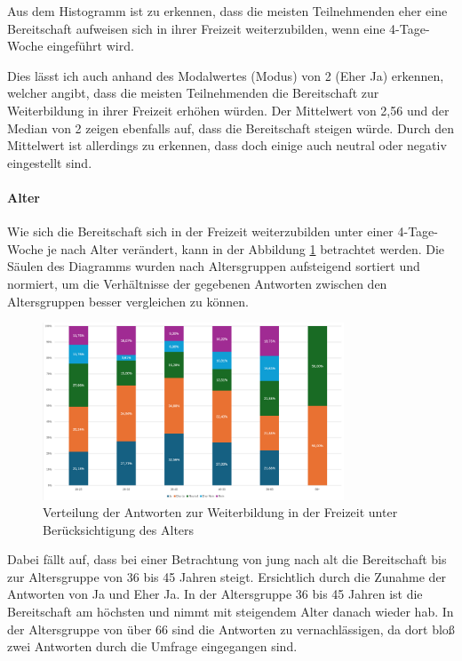 Aus dem Histogramm ist zu erkennen, dass die meisten Teilnehmenden eher 
eine Bereitschaft aufweisen sich in ihrer Freizeit weiterzubilden, 
wenn eine 4-Tage-Woche eingeführt wird.

Dies lässt ich auch anhand des Modalwertes (Modus) von 2 (Eher Ja) erkennen, welcher angibt, dass die
meisten Teilnehmenden die Bereitschaft zur Weiterbildung in ihrer Freizeit erhöhen würden.
Der Mittelwert von 2,56 und der Median von 2 zeigen ebenfalls auf, dass die Bereitschaft steigen würde.
Durch den Mittelwert ist allerdings zu erkennen, dass doch einige auch neutral oder negativ 
eingestellt sind.

\paragraph*{Alter}

Wie sich die Bereitschaft sich in der Freizeit weiterzubilden unter einer 4-Tage-Woche je nach Alter verändert,
kann in der Abbildung \ref{fig:bereitschaft_weiterbildung_alter} betrachtet werden. 
Die Säulen des Diagramms wurden nach Altersgruppen aufsteigend sortiert und normiert, um die Verhältnisse
der gegebenen Antworten zwischen den Altersgruppen besser vergleichen zu können.

\begin{figure}
    \centering
    \includegraphics[width=0.8\textwidth]{04_Artefakte/01_Abbildungen/hypothese_9/weiterbildung_alter.png}
    \caption{Verteilung der Antworten zur Weiterbildung in der Freizeit unter Berücksichtigung des Alters}
    \label{fig:bereitschaft_weiterbildung_alter}
\end{figure}

Dabei fällt auf, dass bei einer Betrachtung von jung nach alt die Bereitschaft bis zur Altersgruppe von
36 bis 45 Jahren steigt. Ersichtlich durch die Zunahme der Antworten von Ja und Eher Ja.
In der Altersgruppe 36 bis 45 Jahren ist die Bereitschaft am höchsten und nimmt mit steigendem Alter danach
wieder hab. In der Altersgruppe von über 66 sind die Antworten zu vernachlässigen, da dort bloß
zwei Antworten durch die Umfrage eingegangen sind.

